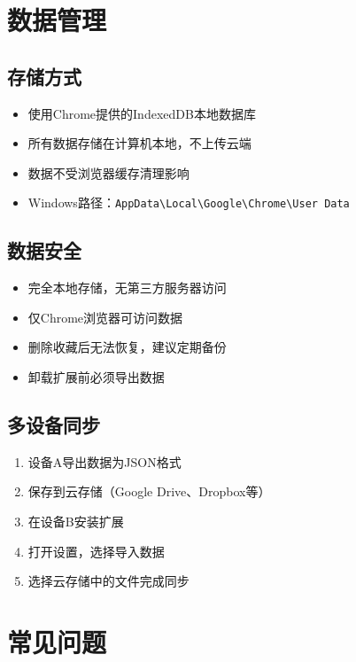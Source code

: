 \documentclass[10pt,a4paper]{article}
\begin{document}
\vspace{5pt}

\section{数据管理}

\subsection{存储方式}
\begin{itemize}
  \item 使用Chrome提供的IndexedDB本地数据库
  \item 所有数据存储在计算机本地，不上传云端
  \item 数据不受浏览器缓存清理影响
  \item Windows路径：\texttt{AppData\textbackslash Local\textbackslash Google\textbackslash Chrome\textbackslash User Data}
\end{itemize}

\subsection{数据安全}
\begin{itemize}
  \item 完全本地存储，无第三方服务器访问
  \item 仅Chrome浏览器可访问数据
  \item 删除收藏后无法恢复，建议定期备份
  \item 卸载扩展前必须导出数据
\end{itemize}

\subsection{多设备同步}
\begin{enumerate}
  \item 设备A导出数据为JSON格式
  \item 保存到云存储（Google Drive、Dropbox等）
  \item 在设备B安装扩展
  \item 打开设置，选择导入数据
  \item 选择云存储中的文件完成同步
\end{enumerate}

\vspace{5pt}

\section{常见问题}
\end{document}

